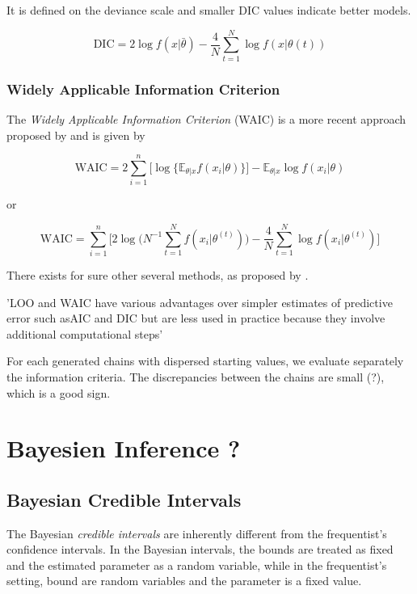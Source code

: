 It is defined on the deviance scale and smaller DIC values indicate better models.

\begin{equation}
\text{DIC}= 2\log f(x|\bar{\theta}) - \frac{4}{N} \sum_{t=1}^N\log f(x|\theta{(t)})
\end{equation}



\subsubsection*{Widely Applicable Information Criterion}

The \emph{Widely Applicable Information Criterion} (WAIC) is a more recent approach proposed by \citet{Watanabe_asymptotic_2010} and is given by 


\begin{equation}
\text{WAIC}= 2 \sum_{i=1}^n\big[\log\big\{\mathbb{E}_{\theta|x}f(x_i|\theta)\big\}\big]- \mathbb{E}_{\theta|x}\log f(x_i|\theta) 
\end{equation}

or 

\begin{equation}
\text{WAIC} = \sum_{i=1}^n\Bigg[2\log \bigg(N^{-1}\sum_{t=1}^N f(x_i|\theta^{(t)})\bigg)-\frac{4}{N}\sum_{t=1}^N\log f(x_i|\theta^{(t)})\Bigg]
\end{equation}



There exists for sure other several methods, as proposed by \citet{gelman_understanding_2014}.
 
 'LOO and WAIC have various advantages over simpler estimates of predictive error such asAIC and DIC but are less used in practice because they involve additional computational steps' 


For each generated chains with dispersed starting values, we evaluate separately the information criteria. The discrepancies between the chains are small (?), which is a good sign. 

\section{Bayesien Inference ?}

\subsection{Bayesian Credible Intervals}\label{bayes_cred_int}

The Bayesian \emph{credible intervals} are inherently different from the frequentist's confidence intervals. In the Bayesian intervals, the bounds are treated as fixed and the estimated parameter as a random variable, while in the frequentist's setting, bound are random variables and the parameter is a fixed value.

